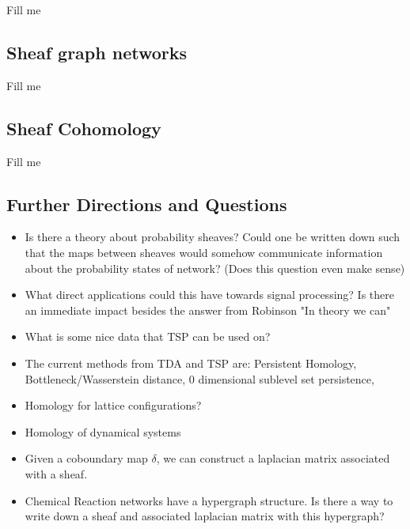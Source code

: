 \documentclass[12pt]{article}
\begin{document}
Fill me 

\subsection{Sheaf graph networks}

Fill me 

\subsection{Sheaf Cohomology}

Fill me

\subsection{Further Directions and Questions}

\begin{itemize}
  \item Is there a theory about probability sheaves? Could one be written down such that
    the maps between sheaves would somehow communicate information about the probability 
    states of network? (Does this question even make sense)

  \item What direct applications could this have towards signal processing? Is there an immediate
    impact besides the answer from Robinson "In theory we can"

  \item What is some nice data that TSP can be used on?

  \item The current methods from TDA and TSP are: Persistent Homology, Bottleneck/Wasserstein distance, 
    0 dimensional sublevel set persistence, 

  \item Homology for lattice configurations?

  \item Homology of dynamical systems

  \item Given a coboundary map $\delta$, we can construct a laplacian matrix associated with a sheaf.

  \item Chemical Reaction networks have a hypergraph structure. Is there a way to write down a sheaf and associated
    laplacian matrix with this hypergraph?

\end{itemize}
\end{document}
